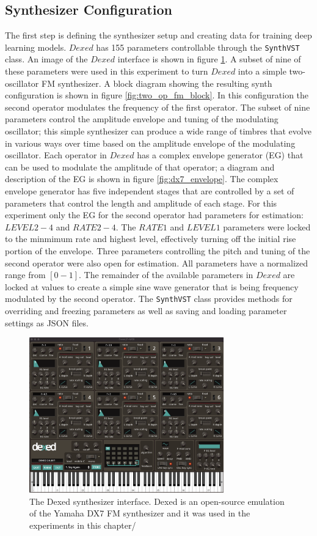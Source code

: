 \subsection{Synthesizer Configuration}
The first step is defining the synthesizer setup and creating data for training deep learning models. $Dexed$ has 155 parameters controllable through the \texttt{SynthVST} class. An image of the $Dexed$ interface is shown in figure \ref{fig:dexed}. A subset of nine of these parameters were used in this experiment to turn $Dexed$ into a simple two-oscillator FM synthesizer. A block diagram showing the resulting synth configuration is shown in figure \ref{fig:two_op_fm_block}. In this configuration the second operator modulates the frequency of the first operator. The subset of nine parameters control the amplitude envelope and tuning of the modulating oscillator; this simple synthesizer can produce a wide range of timbres that evolve in various ways over time based on the amplitude envelope of the modulating oscillator. Each operator in $Dexed$ has a complex envelope generator (EG) that can be used to modulate the amplitude of that operator; a diagram and description of the EG is shown in figure \ref{fig:dx7_envelope}. The complex envelope generator has five independent stages that are controlled by a set of parameters that control the length and amplitude of each stage. For this experiment only the EG for the second operator had parameters for estimation: $LEVEL 2-4$ and $RATE 2-4$. The $RATE 1$ and $LEVEL 1$ parameters were locked to the minmimum rate and highest level, effectively turning off the initial rise portion of the envelope. Three parameters controlling the pitch and tuning of the second operator were also open for estimation. All parameters have a normalized range from $[0-1]$. The remainder of the available parameters in $Dexed$ are locked at values to create a simple sine wave generator that is being frequency modulated by the second operator. The \texttt{SynthVST} class provides methods for overriding and freezing parameters as well as saving and loading parameter settings as JSON files. 

\begin{figure}[ht]
    \centering
    \includegraphics[width=0.75\textwidth]{figures/spiegelib/dexed.png}
    \caption{The Dexed synthesizer interface. Dexed is an open-source emulation of the Yamaha DX7 FM synthesizer and it was used in the experiments in this chapter/}
    \label{fig:dexed}
\end{figure}

